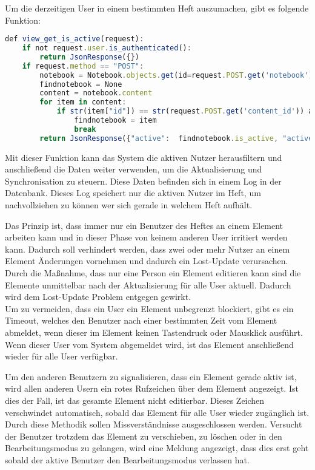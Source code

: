 Um die derzeitigen User in einem bestimmten Heft auszumachen, gibt es folgende Funktion:
\begin{lstlisting}[caption={Abfrage der aktiven Nutzer - PWS}, language=Javascript]
def view_get_is_active(request):
    if not request.user.is_authenticated():
        return JsonResponse({})
    if request.method == "POST":
        notebook = Notebook.objects.get(id=request.POST.get('notebook'))
        findnotebook = None
        content = notebook.content
        for item in content:
            if str(item["id"]) == str(request.POST.get('content_id')) and item["art"] == request.POST.get('content_art'):
                findnotebook = item
                break
        return JsonResponse({"active":  findnotebook.is_active, "active_by": findnotebook.is_active_by})
\end{lstlisting}
Mit dieser Funktion kann das System die aktiven Nutzer herausfiltern und anschließend die Daten weiter verwenden, um die Aktualisierung und Synchronisation zu steuern. Diese Daten befinden sich in einem Log in der Datenbank. Dieses Log speichert nur die aktiven Nutzer im Heft, um nachvollziehen zu können wer sich gerade in welchem Heft aufhält.

Das Prinzip ist, dass immer nur ein Benutzer des Heftes an einem Element arbeiten kann und in dieser Phase von keinem anderen User irritiert werden kann. Dadurch soll verhindert werden, dass zwei oder mehr Nutzer an einem Element Änderungen vornehmen und dadurch ein Lost-Update verursachen. Durch die Maßnahme, dass nur eine Person ein Element editieren kann sind die Elemente unmittelbar nach der Aktualisierung für alle User aktuell. Dadurch wird dem Lost-Update Problem entgegen gewirkt.\cite{DATENBANKSYSTEME}\\
Um zu vermeiden, dass ein User ein Element unbegrenzt blockiert, gibt es ein Timeout, welches den Benutzer nach einer bestimmten Zeit vom Element abmeldet, wenn dieser im Element keinen Tastendruck oder Mausklick ausführt. Wenn dieser User vom System abgemeldet wird, ist das Element anschließend wieder für alle User verfügbar.

Um den anderen Benutzern zu signalisieren, dass ein Element gerade aktiv ist, wird allen anderen Usern ein rotes Rufzeichen über dem Element angezeigt. Ist dies der Fall, ist das gesamte Element nicht editierbar. 
Dieses Zeichen verschwindet automatisch, sobald das Element für alle User wieder zugänglich ist. Durch diese Methodik sollen Missverständnisse ausgeschlossen werden. Versucht der Benutzer trotzdem das Element zu verschieben, zu löschen oder in den Bearbeitungsmodus zu gelangen, wird eine Meldung angezeigt, dass dies erst geht sobald der aktive Benutzer den Bearbeitungsmodus verlassen hat. 

